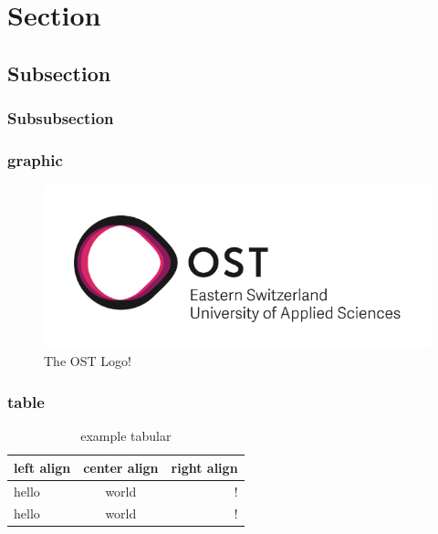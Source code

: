 

\section{Section}



\subsection{Subsection}


\subsubsection{Subsubsection}
\lipsum[1]



\subsubsection{graphic}
\begin{figure}[h]
    \centering
    \includegraphics[scale=0.5]{img/OST_Logo}
    \caption{The OST Logo!}
\end{figure}

\subsubsection{table}
\begin{table}[h]
    \centering
    \caption{example tabular}
    \label{tab:example tabular}
        \begin{tabular}{l | c | r}
            \hline
            left align & center align & right align\\ \hline
            \hline
            hello & world & !\\ \hline
            hello & world & !\\ \hline
        \end{tabular}
\end{table}

